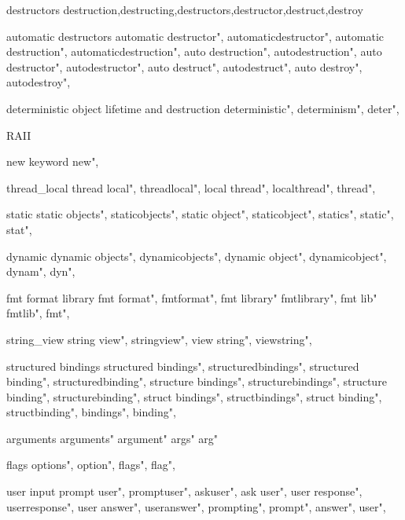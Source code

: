          destructors
        destruction,destructing,destructors,destructor,destruct,destroy
        
         automatic destructors 
        automatic destructor",  
        automaticdestructor",  
        automatic destruction", 
        automaticdestruction", 
        auto destruction",  
        autodestruction",  
        auto destructor",  
        autodestructor",  
        auto destruct",  
        autodestruct",  
        auto destroy",  
        autodestroy",  
        
         deterministic object lifetime and destruction
        deterministic",  
        determinism",  
        deter",  
        
         RAII 
        
         new keyword 
        new",
        
         thread_local
        thread local",
        threadlocal",
        local thread",
        localthread",
        thread",
        
         static 
        static objects",
        staticobjects",
        static object",
        staticobject",
        statics",
        static",
        stat", 
        
         dynamic 
        dynamic objects",
        dynamicobjects",
        dynamic object",
        dynamicobject",
        dynam",
        dyn",
        
         fmt format library
        fmt format",
        fmtformat",
        fmt library"
        fmtlibrary",
        fmt lib"
        fmtlib",
        fmt",
          
         string_view
        string view",
        stringview",
        view string",
        viewstring",
        
         structured bindings
        structured bindings",
        structuredbindings",
        structured binding",
        structuredbinding", 
        structure bindings",
        structurebindings", 
        structure binding", 
        structurebinding",
        struct bindings",
        structbindings",
        struct binding",
        structbinding",
        bindings",
        binding",
        
         arguments 
        arguments"
        argument"
        args"
        arg"
        
         flags 
        options",
        option",
        flags",
        flag",
        
         user input 
        prompt user",  
        promptuser",  
        askuser",  
        ask user",  
        user response",  
        userresponse",  
        user answer",  
        useranswer",  
        prompting",  
        prompt",  
        answer",  
        user",  
        
